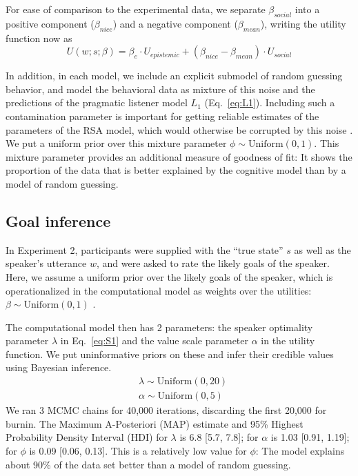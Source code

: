 \documentclass[10pt,letterpaper]{article}
\begin{document}
For ease of comparison to the experimental data, we separate $\beta_{social}$ into a positive component ($\beta_{nice}$) and a negative component ($\beta_{mean}$), writing the utility function now as
$$
U(w;s; \beta) = \beta_{e}\cdot U_{epistemic} + (\beta_{nice} - \beta_{mean}) \cdot U_{social}
$$

In addition, in each model, we include an explicit submodel of random guessing behavior, and model the behavioral data as mixture of this noise and the predictions of the pragmatic listener model $L_1$ (Eq.~\ref{eq:L1}).
Including such a contamination parameter is important for getting reliable estimates of the parameters of the RSA model, which would otherwise be corrupted by this noise \cite{LW2014}. 
We put a uniform prior over this mixture parameter $\phi \sim \text{Uniform}(0,1)$. 
This mixture parameter provides an additional measure of goodness of fit: It shows the proportion of the data that is better explained by the cognitive model than by a model of random guessing. 

\subsection{Goal inference}

In Experiment 2, participants were supplied with the ``true state'' $s$ as well as the speaker's utterance $w$, and were asked to rate the likely goals of the speaker. 
Here, we assume a uniform prior over the likely goals of the speaker, which is operationalized in the computational model as weights over the utilities: $\beta \sim \text{Uniform}(0,1)$ .


The computational model then has 2 parameters: the speaker optimality parameter $\lambda$ in Eq.~\ref{eq:S1} and the value scale parameter $\alpha$ in the utility function. 
We put uninformative priors on these and infer their credible values using Bayesian inference.
\begin{eqnarray*}
& \lambda \sim \text{Uniform}(0,20)\\
& \alpha \sim \text{Uniform}(0, 5)
\end{eqnarray*}
We ran 3 MCMC chains for 40,000 iterations, discarding the first 20,000 for burnin.
The Maximum A-Posteriori (MAP) estimate and 95\% Highest Probability Density Interval (HDI) for $\lambda$ is 6.8 [5.7, 7.8]; for $\alpha$ is 1.03 [0.91, 1.19]; for $\phi$ is 0.09 [0.06, 0.13].
This is a relatively low value for $\phi$: The model explains about 90\% of the data set better than a model of random guessing.
\end{document}
